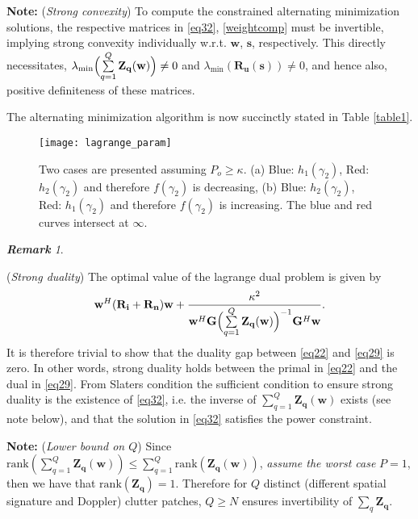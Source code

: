 \documentclass[11pt,draftclsnofoot,onecolumn]{IEEEtran}
\theoremstyle{definition}
\theoremstyle{remark}
\newtheorem{remk}{\bf Remark}
\begin{document}
{\bf Note:} ({\it Strong convexity}) To compute the constrained alternating minimization solutions, the respective matrices in \eqref{eq32}, \eqref{weightcomp} must be invertible, implying strong convexity individually  w.r.t. $\mathbf{w}$, $\mathbf{s}$, respectively. This directly necessitates, $\lambda_{\min}\Bigl( \sum\limits_{q=1}^Q \mathbf{Z_q}( \mathbf{w})\Bigr)\neq 0$ and $\lambda_{\min} (\mathbf{R_u}(\mathbf{s}) )\neq 0$, and hence also, positive definiteness of these matrices.

The alternating minimization algorithm is now succinctly stated in Table \ref{table1}.

\begin{figure} [tbp!]
\centering
\texttt{[image: lagrange\_param]}
\caption{Two cases are presented assuming $P_o\geq \kappa$. (a) Blue: $h_1(\gamma_2)$, Red: $h_2(\gamma_2)$ and therefore $f(\gamma_2)$ is decreasing, (b)  Blue: $h_2(\gamma_2)$, Red: $h_1(\gamma_2)$ and therefore $f(\gamma_2)$ is increasing. The blue and red curves intersect at $\infty$.}
\label{figlagrange}
\end{figure}

\begin{remk}\label{dualprop}

({\it Strong duality}) The optimal value of the lagrange dual problem is given by
\begin{equation*} 
\mathbf{w}^H( \mathbf{R_i+R_n})\mathbf{w} +\frac{\kappa^2}{\mathbf{w}^H\mathbf{G} \Bigl( \sum\limits_{q=1}^Q \mathbf{Z_q}( \mathbf{w})\Bigr)^{-1}\mathbf{G}^H\mathbf{w}}.
\end{equation*}
It is therefore trivial to show that the duality gap between \eqref{eq22} and \eqref{eq29} is zero.
 In other words, strong duality holds between the primal in \eqref{eq22} and the dual in \eqref{eq29}. From Slaters condition \cite{Boyd2004} the sufficient condition to ensure strong duality is the existence of \eqref{eq32}, i.e. the inverse of $\sum\limits_{q=1}^Q \mathbf{Z_q}( \mathbf{w})$ exists (see note below), and that the solution in \eqref{eq32} satisfies the power constraint.
\end{remk}


{\bf Note:} ({\it Lower bound on $Q$}) Since $\mathrm{rank}( \sum\limits_{q=1}^Q \mathbf{Z_q}( \mathbf{w}))\leq \sum\limits_{q=1}^Q\mathrm{rank}(  \mathbf{Z_q}( \mathbf{w}))$, {\it assume the worst case} $P=1$, then we have that $\mathrm{rank}(\mathbf{Z_q})=1$. Therefore for $Q$ distinct  (different spatial signature and Doppler) clutter patches, $Q\geq N$ ensures invertibility of $\sum\limits_q \mathbf{Z_q}$.
\end{document}
